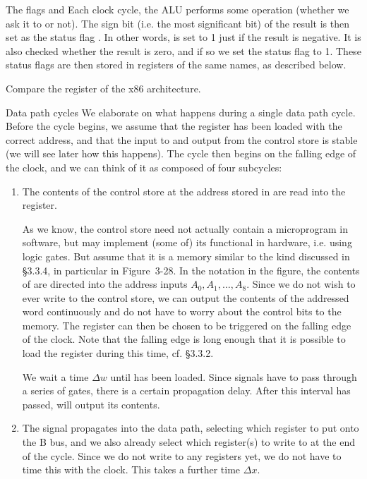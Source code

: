 \documentclass[article, a4paper, 11pt, oneside]{memoir}
\numberwithin{equation}{chapter}
\begin{document}
\begin{notelist}
\item[The flags \reg{N} and \reg{Z}]
Each clock cycle, the ALU performs some operation (whether we ask it to or not). The sign bit (i.e. the most significant bit) of the result is then set as the status flag . In other words,  is set to 1 just if the result is negative. It is also checked whether the result is zero, and if so we set the status flag  to 1. These status flags are then stored in registers of the same names, as described below.

Compare the  register of the x86 architecture.

\item[Data path cycles]
We elaborate on what happens during a single data path cycle. Before the cycle begins, we assume that the  register has been loaded with the correct address, and that the input to and output from the control store is stable (we will see later how this happens). The cycle then begins on the falling edge of the clock, and we can think of it as composed of four subcycles:
%
\begin{enumerate}
    \item The contents of the control store at the address stored in  are read into the  register.
    
    As we know, the control store need not actually contain a microprogram in software, but may implement (some of) its functional in hardware, i.e. using logic gates. But assume that it is a memory similar to the kind discussed in §3.3.4, in particular in Figure~3-28. In the notation in the figure, the contents of  are directed into the address inputs $A_0, A_1, \ldots, A_8$. Since we do not wish to ever write to the control store, we can output the contents of the addressed word continuously and do not have to worry about the control bits to the memory. The register  can then be chosen to be triggered on the falling edge of the clock. Note that the falling edge is long enough that it is possible to load the register during this time, cf. §3.3.2.

    We wait a time $\Delta w$ until  has been loaded. Since signals have to pass through a series of gates, there is a certain propagation delay. After this interval has passed,  will output its contents.

    \item The signal propagates into the data path, selecting which register to put onto the B bus, and we also already select which register(s) to write to at the end of the cycle. Since we do not write to any registers yet, we do not have to time this with the clock. This takes a further time $\Delta x$.


\end{enumerate}
\end{notelist}
\end{document}

